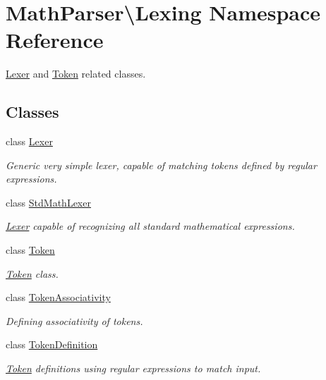 \hypertarget{namespaceMathParser_1_1Lexing}{\section{Math\-Parser\textbackslash{}Lexing Namespace Reference}
\label{namespaceMathParser_1_1Lexing}
}


\hyperlink{classMathParser_1_1Lexing_1_1Lexer}{Lexer} and \hyperlink{classMathParser_1_1Lexing_1_1Token}{Token} related classes.  


\subsection*{Classes}
\begin{DoxyCompactItemize}
\item 
class \hyperlink{classMathParser_1_1Lexing_1_1Lexer}{Lexer}
\begin{DoxyCompactList}\small\item\em Generic very simple lexer, capable of matching tokens defined by regular expressions. \end{DoxyCompactList}\item 
class \hyperlink{classMathParser_1_1Lexing_1_1StdMathLexer}{Std\-Math\-Lexer}
\begin{DoxyCompactList}\small\item\em \hyperlink{classMathParser_1_1Lexing_1_1Lexer}{Lexer} capable of recognizing all standard mathematical expressions. \end{DoxyCompactList}\item 
class \hyperlink{classMathParser_1_1Lexing_1_1Token}{Token}
\begin{DoxyCompactList}\small\item\em \hyperlink{classMathParser_1_1Lexing_1_1Token}{Token} class. \end{DoxyCompactList}\item 
class \hyperlink{classMathParser_1_1Lexing_1_1TokenAssociativity}{Token\-Associativity}
\begin{DoxyCompactList}\small\item\em Defining associativity of tokens. \end{DoxyCompactList}\item 
class \hyperlink{classMathParser_1_1Lexing_1_1TokenDefinition}{Token\-Definition}
\begin{DoxyCompactList}\small\item\em \hyperlink{classMathParser_1_1Lexing_1_1Token}{Token} definitions using regular expressions to match input. \end{DoxyCompactList}\item 

\end{DoxyCompactItemize}
